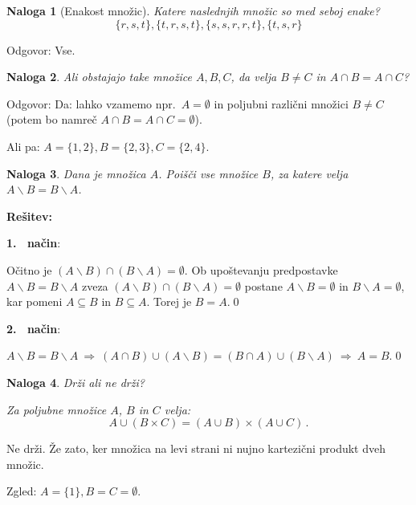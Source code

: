 \documentclass[11pt,paper=b5,DIV=13,headinclude,footinclude]{scrbook}
\def\sledi {{~\Rightarrow~}}
\newtheorem*{problem}{Naloga}
\begin{document}
\begin{problem}[Enakost množic]
Katere naslednjih množic so med seboj enake?
$$\{r,s,t\}, \{t,r,s,t\}, \{s,s,r,r,t\}, \{t,s,r\}$$
\end{problem}

Odgovor: Vse.

\bigskip
\begin{problem}
Ali obstajajo take množice $A, B, C$, da velja $B\neq C$ in $A\cap B = A\cap C$?
\end{problem}

Odgovor: Da: lahko vzamemo npr.~$A = \emptyset$ in poljubni različni množici $B\neq C$
(potem bo namreč $A\cap B = A\cap C = \emptyset$).

Ali pa: $A = \{1,2\}, B = \{2,3\}, C = \{2,4\}$.


\begin{problem}
Dana je množica $A$. Poišči vse množice $B$, za katere velja
$A\backslash B = B\backslash A$.
\end{problem}

\textbf{Rešitev:}

\textbf{1.~ način}:

Očitno je
$(A\backslash B) \cap (B\backslash A)=\emptyset$.
Ob upoštevanju predpostavke $A\backslash B = B\backslash A$
zveza
$(A\backslash B) \cap (B\backslash A)=\emptyset$
postane
$A\backslash B =\emptyset$
in $B\backslash A =\emptyset$, kar pomeni
$A\subseteq B$ in $B\subseteq A$. Torej je $B = A$.\qed

\textbf{2.~ način}:

$A\backslash B = B\backslash A \sledi(A\cap B)\cup (A\backslash B) = (B\cap A)\cup (B\backslash A) \sledi A = B$.\qed

\begin{problem}
Drži ali ne drži?

Za poljubne množice $A$, $B$ in $C$ velja:
$$A\cup (B\times C) = (A\cup B)\times (A\cup C)\,.$$
\end{problem}

Ne drži. Že zato, ker množica na levi strani ni nujno kartezični produkt dveh množic.

Zgled: $A = \{1\}, B = C = \emptyset$.
\end{document}
